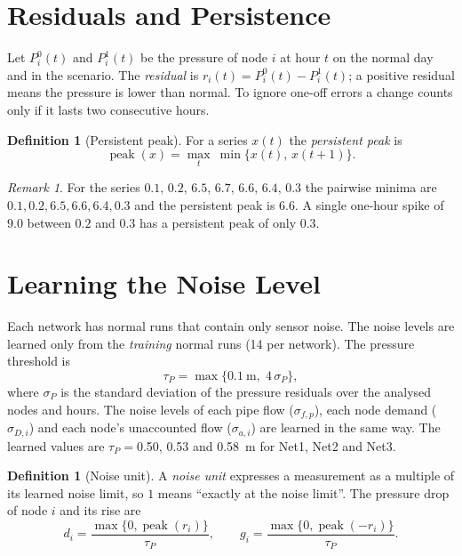 \documentclass[11pt,letterpaper]{report}
\theoremstyle{definition}
\newtheorem{definition}[theorem]{Definition}
\theoremstyle{plain}
\theoremstyle{remark}
\newtheorem{remark}[theorem]{Remark}
\begin{document}
\section{Residuals and Persistence}
Let $P^0_i(t)$ and $P^1_i(t)$ be the pressure of node $i$ at hour $t$ on the normal day and in the scenario. The \emph{residual} is $r_i(t)=P^0_i(t)-P^1_i(t)$; a positive residual means the pressure is lower than normal. To ignore one-off errors a change counts only if it lasts two consecutive hours.
\begin{definition}[Persistent peak]\label{def:peak}
For a series $x(t)$ the \emph{persistent peak} is
\begin{equation}
\operatorname{peak}(x)=\max_t\ \min\{x(t),\,x(t{+}1)\}.
\end{equation}
\end{definition}
\begin{remark}
For the series $0.1,\,0.2,\,6.5,\,6.7,\,6.6,\,6.4,\,0.3$ the pairwise minima are $0.1,0.2,6.5,6.6,6.4,0.3$ and the persistent peak is $6.6$. A single one-hour spike of $9.0$ between $0.2$ and $0.3$ has a persistent peak of only $0.3$.
\end{remark}

\section{Learning the Noise Level}\label{sec:noise}
Each network has normal runs that contain only sensor noise. The noise levels are learned only from the \emph{training} normal runs (14 per network). The pressure threshold is
\begin{equation}\label{eq:tau}
\tau_P=\max\{0.1\ \text{m},\;4\,\sigma_P\},
\end{equation}
where $\sigma_P$ is the standard deviation of the pressure residuals over the analysed nodes and hours. The noise levels of each pipe flow ($\sigma_{f,p}$), each node demand ($\sigma_{D,i}$) and each node's unaccounted flow ($\sigma_{a,i}$) are learned in the same way. The learned values are $\tau_P=$0.50, 0.53 and 0.58~m for Net1, Net2 and Net3.
\begin{definition}[Noise unit]
A \emph{noise unit} expresses a measurement as a multiple of its learned noise limit, so $1$ means ``exactly at the noise limit''. The pressure drop of node $i$ and its rise are
\begin{equation}
d_i=\frac{\max\{0,\operatorname{peak}(r_i)\}}{\tau_P},\qquad g_i=\frac{\max\{0,\operatorname{peak}(-r_i)\}}{\tau_P}.
\end{equation}
\end{definition}
\end{document}
